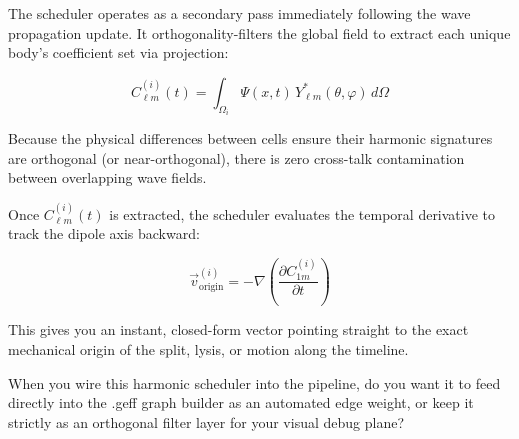 The scheduler operates as a secondary pass immediately following the wave propagation update. It orthogonality-filters the global field to extract each unique body's coefficient set via projection:

\[
C_{\ell m}^{(i)}(t) = \int_{\Omega_i} \Psi(x, t)\, Y_{\ell m}^{*}(\theta, \varphi)\, d\Omega
\]

Because the physical differences between cells ensure their harmonic signatures are orthogonal (or near-orthogonal), there is zero cross-talk contamination between overlapping wave fields.

Once \(C_{\ell m}^{(i)}(t)\) is extracted, the scheduler evaluates the temporal derivative to track the dipole axis backward:

\[
\vec{v}_{\text{origin}}^{(i)} = -\nabla \left( \frac{\partial C_{1m}^{(i)}}{\partial t} \right)
\]

This gives you an instant, closed-form vector pointing straight to the exact mechanical origin of the split, lysis, or motion along the timeline.

When you wire this harmonic scheduler into the pipeline, do you want it to feed directly into the .geff graph builder as an automated edge weight, or keep it strictly as an orthogonal filter layer for your visual debug plane?

